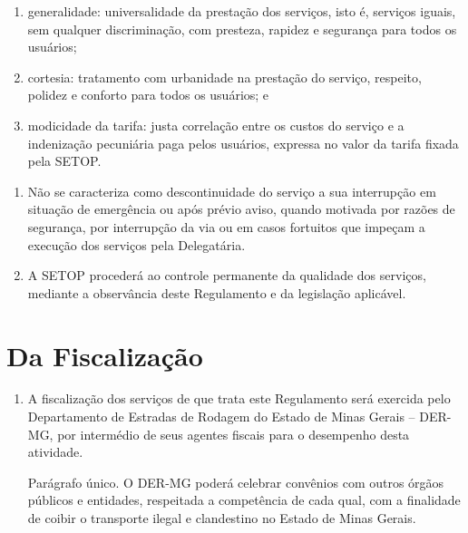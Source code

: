 \begin{enumerate}[label=Art. \arabic*]
\begin{enumerate}[label=\roman*.]
\item generalidade: universalidade da prestação dos serviços, isto é, serviços iguais, sem qualquer discriminação, com presteza, rapidez e segurança para todos os usuários;

\item cortesia: tratamento com urbanidade na prestação do serviço, respeito, polidez e conforto para todos os usuários; e

\item modicidade da tarifa: justa correlação entre os custos do serviço e a indenização pecuniária paga pelos usuários, expressa no valor da tarifa fixada pela SETOP.

\end{enumerate}

\begin{enumerate}[label= \S \arabic*] %

\item Não se caracteriza como descontinuidade do serviço a sua interrupção em situação de emergência ou após prévio aviso, quando motivada por razões de segurança, por interrupção da via ou em casos fortuitos que impeçam a execução dos serviços pela Delegatária.

\item A SETOP procederá ao controle permanente da qualidade dos serviços, mediante a observância deste Regulamento e da legislação aplicável.

\end{enumerate}

\end{enumerate}

\section{Da Fiscalização}

\begin{enumerate}[resume, label=Art. \arabic*]

\item A fiscalização dos serviços de que trata este Regulamento será exercida pelo Departamento de Estradas de Rodagem do Estado de Minas Gerais – DER-MG, por intermédio de seus agentes fiscais para o desempenho desta atividade.

Parágrafo único. O DER-MG poderá celebrar convênios com outros órgãos públicos e entidades, respeitada a competência de cada qual, com a finalidade de coibir o transporte ilegal e clandestino no Estado de Minas Gerais.

\end{enumerate}

